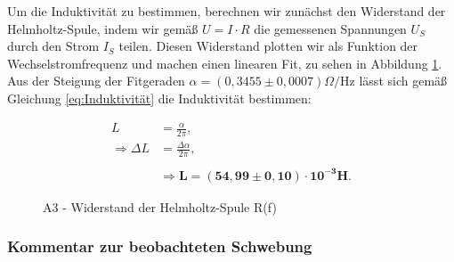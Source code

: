 \documentclass{article}
\begin{document}
Um die Induktivität zu bestimmen, berechnen wir zunächst den Widerstand der Helmholtz-Spule, indem wir gemäß $U = I \cdot R$ die gemessenen Spannungen $U_S$ durch den Strom $I_S$ teilen. Diesen Widerstand plotten wir als Funktion der Wechselstromfrequenz und machen einen linearen Fit, zu sehen in Abbildung \ref{fig:A3-R(f)}. Aus der Steigung der Fitgeraden $\alpha = (0,3455 \pm 0,0007) \Omega /$Hz lässt sich gemäß Gleichung \ref{eq:Induktivität} die Induktivität bestimmen:

\begin{equation}
    \begin{split}
        L &= \frac{\alpha}{2 \pi}, \\
        \Rightarrow \Delta L&= \frac{\Delta \alpha}{2 \pi}, \\ \\
        &\Rightarrow \bm{L = (54,99 \pm 0,10)\cdot 10^{-3}} \textbf{H}.
    \end{split}
\end{equation}

\begin{figure}[!h]
    \centering
    \caption{A3 - Widerstand der Helmholtz-Spule R(f)}
    \label{fig:A3-R(f)}
\end{figure}

\newpage
\subsubsection{Kommentar zur beobachteten Schwebung}
\end{document}
